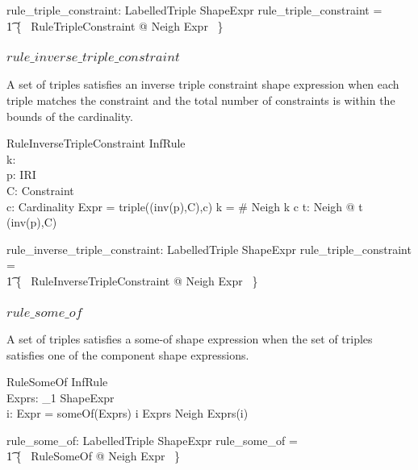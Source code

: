 \documentclass{article}
\begin{document}
\begin{axdef}
	rule\_triple\_constraint: \finset LabelledTriple \rel ShapeExpr
\where
	rule\_triple\_constraint = \\
\t1		\{~ RuleTripleConstraint @ Neigh \mapsto Expr ~\}
\end{axdef}

\subsubsection{$rule\_inverse\_triple\_constraint$}
A set of triples satisfies an inverse triple constraint shape expression when each triple matches the constraint
and the total number of constraints is within the bounds of the cardinality.

\begin{schema}{RuleInverseTripleConstraint}
	InfRule \\
	k: \nat \\
	p: IRI \\
	C: Constraint \\
	c: Cardinality
\where
	Expr = triple((inv(p),C),c)
\also
	k = \# Neigh
\also
	k  c
\also
	\forall t: Neigh @ t  (inv(p),C)
\end{schema}

\begin{axdef}
	rule\_inverse\_triple\_constraint: \finset LabelledTriple \rel ShapeExpr
\where
	rule\_triple\_constraint = \\
\t1		\{~ RuleInverseTripleConstraint @ Neigh \mapsto Expr ~\}
\end{axdef}

\subsubsection{$rule\_some\_of$}
A set of triples satisfies a some-of shape expression when the set of triples satisfies one of the component
shape expressions.
\begin{schema}{RuleSomeOf}
	InfRule \\
	Exprs: \seq_1 ShapeExpr \\
	i: \nat
\where
	Expr = someOf(Exprs)
\also
	i \in \dom Exprs
\also
	Neigh  Exprs(i)
\end{schema}

\begin{axdef}
	rule\_some\_of: \finset LabelledTriple \rel ShapeExpr
\where
	rule\_some\_of = \\
\t1		\{~ RuleSomeOf @ Neigh \mapsto Expr ~\}
\end{axdef}
\end{document}
